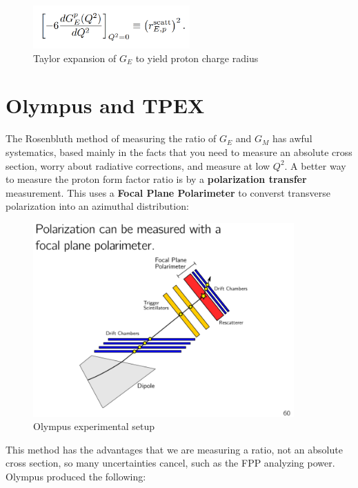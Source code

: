              
                \begin{figure}[H]
                    \centering
                    \includegraphics[width=6cm]{NuclearPhysics/modules/emc-src-scaling/pics/prad-GE.PNG}
                \caption{Taylor expansion of $G_E$ to yield proton charge radius}
                \end{figure}
    \section{Olympus and TPEX}
        The Rosenbluth method of measuring the ratio of $G_E$ and $G_M$ has awful systematics, based mainly in the facts that you need to measure an absolute cross section, worry about radiative corrections, and measure at low $Q^2$. A better way to measure the proton form factor ratio is by a \textbf{polarization transfer} measurement. This uses a \textbf{Focal Plane Polarimeter} to converst transverse polarization into an azimuthal distribution:
        
              
        \begin{figure}[H]
            \centering
            \includegraphics[width=10cm]{NuclearPhysics/modules/lepton-scattering/pics/elastic-ep/olympus-fpp.PNG}
            \caption{Olympus experimental setup}
        \end{figure}
        
        This method has the advantages that we are measuring a ratio, not an absolute cross section, so many uncertainties cancel, such as the FPP analyzing power. Olympus produced the following:
        
